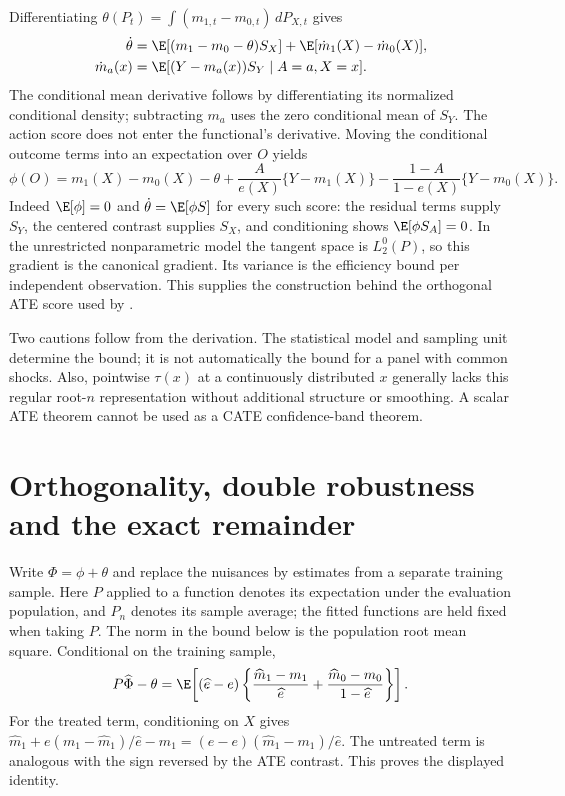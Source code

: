 Differentiating $\theta(P_t)=\int(m_{1,t}-m_{0,t})\,dP_{X,t}$ gives
\begin{align}
 \dot\theta
 &=\E[(m_1-m_0-\theta)S_X]
   +\E[\dot m_1(X)-\dot m_0(X)],\nonumber\\
 \dot m_a(x)
 &=\E[(Y-m_a(x))S_Y\mid A=a,X=x].
 \label{r3:path-derivative}
\end{align}
The conditional mean derivative follows by differentiating its normalized
conditional density; subtracting $m_a$ uses the zero conditional mean
of $S_Y$. The action score does not enter the functional's derivative.
Moving the conditional outcome terms into an expectation over $O$ yields
\begin{equation}
 \phi(O)=m_1(X)-m_0(X)-\theta
       +\frac{A}{e(X)}\{Y-m_1(X)\}
       -\frac{1-A}{1-e(X)}\{Y-m_0(X)\}.
 \label{r3:eif}
\end{equation}
Indeed $\E[\phi]=0$ and $\dot\theta=\E[\phi S]$ for every such score:
the residual terms supply $S_Y$, the centered contrast supplies $S_X$,
and conditioning shows $\E[\phi S_A]=0$. In the unrestricted
nonparametric model the tangent space is $L_2^0(P)$, so this gradient is
the canonical gradient. Its variance is the efficiency bound per
independent observation. This supplies the construction behind the
orthogonal ATE score used by
\citet[Section 5.1, Equation (5.3)]{dml2018}.

Two cautions follow from the derivation. The statistical model and sampling
unit determine the bound; it is not automatically the bound for a panel
with common shocks. Also, pointwise $\tau(x)$ at a continuously distributed
$x$ generally lacks this regular root-$n$ representation without additional
structure or smoothing. A scalar ATE theorem cannot be used as a CATE
confidence-band theorem.

\section{Orthogonality, double robustness and the exact remainder}
\label{r3:ml-remainder}
Write $\Phi=\phi+\theta$ and replace the nuisances by estimates from
a separate training sample. Here $P$ applied to a function denotes its
expectation under the evaluation population, and $P_n$ denotes its sample
average; the fitted functions are held fixed when taking $P$. The norm
in the bound below is the population root mean square. Conditional on
the training sample,
\begin{equation}
 P\widehat\Phi-\theta
 =\E\!\left[(\widehat e-e)
       \left\{\frac{\widehat m_1-m_1}{\widehat e}
             +\frac{\widehat m_0-m_0}{1-\widehat e}\right\}\right].
 \label{r3:exact-remainder}
\end{equation}
For the treated term, conditioning on $X$ gives
$\widehat m_1+e(m_1-\widehat m_1)/\widehat e-m_1
=(\widehat e-e)(\widehat m_1-m_1)/\widehat e$.
The untreated term is analogous with the sign reversed by the ATE
contrast. This proves the displayed identity.

